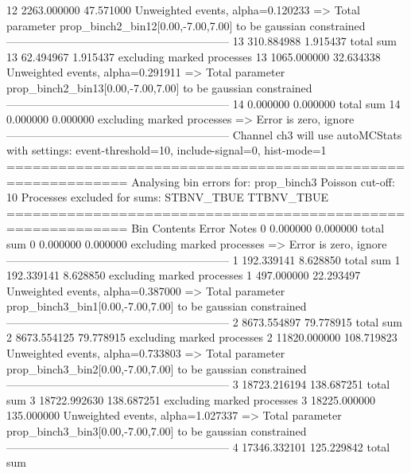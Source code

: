 12         2263.000000     47.571000       Unweighted events, alpha=0.120233
  => Total parameter prop_binch2_bin12[0.00,-7.00,7.00] to be gaussian constrained
------------------------------------------------------------
13         310.884988      1.915437        total sum                     
13         62.494967       1.915437        excluding marked processes    
13         1065.000000     32.634338       Unweighted events, alpha=0.291911
  => Total parameter prop_binch2_bin13[0.00,-7.00,7.00] to be gaussian constrained
------------------------------------------------------------
14         0.000000        0.000000        total sum                     
14         0.000000        0.000000        excluding marked processes    
  => Error is zero, ignore      
------------------------------------------------------------
Channel ch3 will use autoMCStats with settings: event-threshold=10, include-signal=0, hist-mode=1
============================================================
Analysing bin errors for: prop_binch3
Poisson cut-off: 10
Processes excluded for sums: STBNV_TBUE TTBNV_TBUE
============================================================
Bin        Contents        Error           Notes                         
0          0.000000        0.000000        total sum                     
0          0.000000        0.000000        excluding marked processes    
  => Error is zero, ignore      
------------------------------------------------------------
1          192.339141      8.628850        total sum                     
1          192.339141      8.628850        excluding marked processes    
1          497.000000      22.293497       Unweighted events, alpha=0.387000
  => Total parameter prop_binch3_bin1[0.00,-7.00,7.00] to be gaussian constrained
------------------------------------------------------------
2          8673.554897     79.778915       total sum                     
2          8673.554125     79.778915       excluding marked processes    
2          11820.000000    108.719823      Unweighted events, alpha=0.733803
  => Total parameter prop_binch3_bin2[0.00,-7.00,7.00] to be gaussian constrained
------------------------------------------------------------
3          18723.216194    138.687251      total sum                     
3          18722.992630    138.687251      excluding marked processes    
3          18225.000000    135.000000      Unweighted events, alpha=1.027337
  => Total parameter prop_binch3_bin3[0.00,-7.00,7.00] to be gaussian constrained
------------------------------------------------------------
4          17346.332101    125.229842      total sum                     
